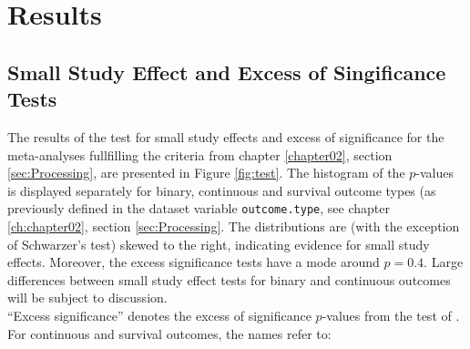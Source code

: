 \documentclass[11pt,a4paper,twoside]{book}\usepackage[]{graphicx}\usepackage[]{color}
\begin{document}





































\chapter{Results}


\section{Small Study Effect and Excess of Singificance Tests}


The results of the test for small study effects and excess of significance for the meta-analyses fullfilling the criteria from chapter \ref{chapter02}, section \ref{sec:Processing}, are presented in Figure \ref{fig:test}.
The histogram of the $p$-values is displayed separately for binary, continuous and survival outcome types (as previously defined in the dataset variable \texttt{outcome.type}, see chapter \ref{ch:chapter02}, section \ref{sec:Processing}. The distributions are (with the exception of Schwarzer's test) skewed to the right, indicating evidence for small study effects. Moreover, the excess significance tests have a mode around $p = 0.4$. Large differences between small study effect tests for binary and continuous outcomes will be subject to discussion. \\
``Excess significance'' denotes the excess of significance $p$-values from the test of \citet{excess.significance}. For continuous and survival outcomes, the names refer to: 
\end{document}
